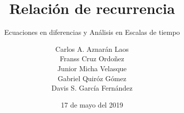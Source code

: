 \documentclass[graybox,envcountchap,sectrefs]{svmono}
\date{17 de mayo del 2019}
\begin{document}
\author{Carlos A. Aznarán Laos\\
Franss Cruz Ordoñez\\
Junior Micha Velasque\\
Gabriel Quiróz Gómez\\
Davis S. García Fernández}
\title{Relación de recurrencia}
\subtitle{Ecuaciones en diferencias y Análisis en Escalas de tiempo}
\maketitle

\frontmatter%





\tableofcontents



\mainmatter%


%
%





%
%


\backmatter%
%
%

\printindex

\end{document}
